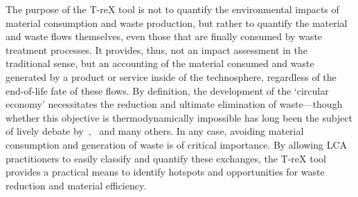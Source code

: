 The purpose of the T-reX tool is not to quantify the environmental impacts of material consumption and waste production, but rather to quantify the material and waste flows themselves, even those that are finally consumed by waste treatment processes. It provides, thus, not an impact assessment in the traditional sense, but an accounting of the material consumed and waste generated by a product or service inside of the technosphere, regardless of the end-of-life fate of these flows. By definition, the development of the `circular economy' necessitates the reduction and ultimate elimination of waste---though whether this objective is thermodynamically impossible has long been the subject of lively debate by~\cite{ayres1998recycling},~\cite{reuter2012recyclinglimits} and many others. In any case, avoiding material consumption and generation of waste is of critical importance. By allowing LCA practitioners to easily classify and quantify these exchanges, the T-reX tool provides a practical means to identify hotspots and opportunities for waste reduction and material efficiency.




